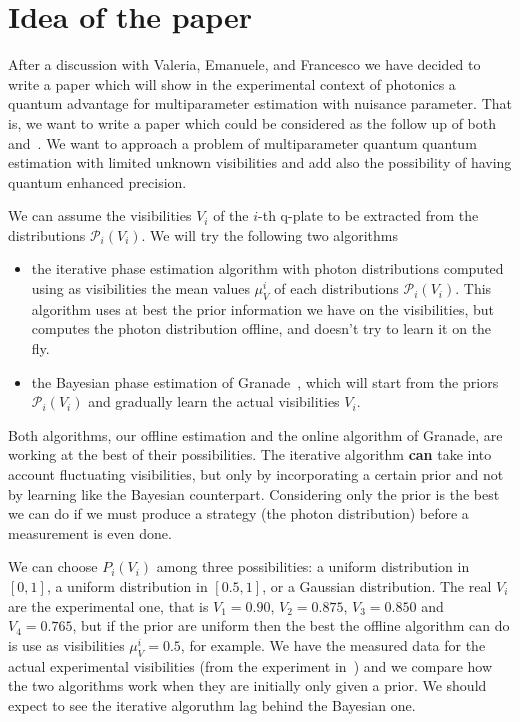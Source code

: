 \documentclass[aps, pra, 10pt, twocolumn, superscriptaddress,floatfix]{revtex4-1}
\begin{document}
\section{Idea of the paper}
%
After a discussion with Valeria, Emanuele, and Francesco we have decided to write a paper which will show in the experimental context of photonics a quantum advantage for multiparameter estimation with nuisance parameter. That is, we want to write a paper which could be considered as the follow up of both~\cite{Cimini2021} and~\cite{Roccia2018}. We want to approach a problem of multiparameter quantum quantum estimation with limited unknown visibilities and add also the possibility of having quantum enhanced precision. 

We can assume the visibilities $V_i$ of the $i$-th q-plate to be extracted from the distributions $\mathcal{P}_i(V_i)$. We will try the following two algorithms
%
\begin{itemize}
	\item the iterative phase estimation algorithm with photon distributions computed using as visibilities the mean values $\mu_V^i$ of each distributions $\mathcal{P}_i(V_i)$. This algorithm uses at best the prior information we have on the visibilities, but computes the photon distribution offline, and doesn't try to learn it on the fly.
	
	\item the Bayesian phase estimation of Granade~\cite{Granade2012}, which will start from the priors $\mathcal{P}_i(V_i)$ and gradually learn the actual visibilities $V_i$.
\end{itemize}
%
Both algorithms, our offline estimation and the online algorithm of Granade, are working at the best of their possibilities. The iterative algorithm \textbf{can} take into account fluctuating visibilities, but only by incorporating a certain prior and not by learning like the Bayesian counterpart. Considering only the prior is the best we can do if we must produce a strategy (the photon distribution) before a measurement is even done.

We can choose $P_i (V_i)$ among three possibilities: a uniform distribution in $[0, 1]$, a uniform distribution in $[0.5, 1]$, or a Gaussian distribution. The real $V_i$ are the experimental one, that is $V_1 = 0.90$, $V_2 = 0.875$, $V_3 = 0.850$ and $V_4 = 0.765$, but if the prior are uniform then the best the offline algorithm can do is use as visibilities $\mu_V^i = 0.5$, for example. We have the measured data for the actual experimental visibilities (from the experiment in~\cite{Cimini2021}) and we compare how the two algorithms  work when they are initially only given a prior. We should expect to see the iterative algoruthm lag behind the Bayesian one. 
\end{document}
